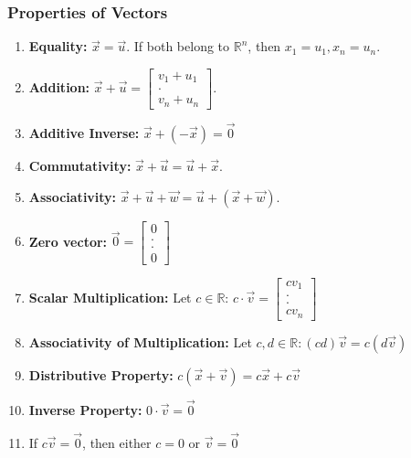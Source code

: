 \documentclass[11pt]{article}
\theoremstyle{plain}
\theoremstyle{remark}
\theoremstyle{plain}
\newcommand{\bd}{\textbf}
\newcommand{\rn}{\mathbb{R}}
\begin{document}
\subsubsection{Properties of Vectors}
\begin{enumerate}[label=\Roman*.]
    \item \bd{Equality:} $\overrightarrow{x} = \overrightarrow{u}$. If both belong to $\rn^n$, then $x_1 = u_1, x_n = u_n$.
    \item \bd{Addition:} $\overrightarrow{x} + \overrightarrow{u} = 
    \begin{bmatrix}
        v_1 + u_1 \\
        .
        \\
        v_n + u_n
    \end{bmatrix}$.
    \item \bd{Additive Inverse:} $\overrightarrow{x} + (-\overrightarrow{x}) = \overrightarrow{0}$
    \item \bd{Commutativity:} $\overrightarrow{x} + \overrightarrow{u} = \overrightarrow{u} + \overrightarrow{x}$.
    \item \bd{Associativity:} $\overrightarrow{x} + \overrightarrow{u} + \overrightarrow{w} = \overrightarrow{u} + (\overrightarrow{x} + \overrightarrow{w})$.
    \item \bd{Zero vector:} $\overrightarrow{0} = \begin{bmatrix}
        0 \\. \\. \\0
    \end{bmatrix}$
    \item \bd{Scalar Multiplication:} Let $c\in\rn$: $ c\cdot \overrightarrow{v} = \begin{bmatrix}
        cv_1\\.\\.\\cv_n
    \end{bmatrix}$
    \item \bd{Associativity of Multiplication:} Let $c,d \in \rn: (cd)\overrightarrow{v} = c(d\overrightarrow{v})$
    \item \bd{Distributive Property:} $c(\overrightarrow{x} + \overrightarrow{v}) = c\overrightarrow{x} + c\overrightarrow{v}$
    \item \bd{Inverse Property:} $0 \cdot \overrightarrow{v} = \overrightarrow{0}$
    \item If $c\overrightarrow{v} = \overrightarrow{0}$, then either $c = 0$ or $\overrightarrow{v} = \overrightarrow{0}$
    \end{enumerate}
\end{document}
